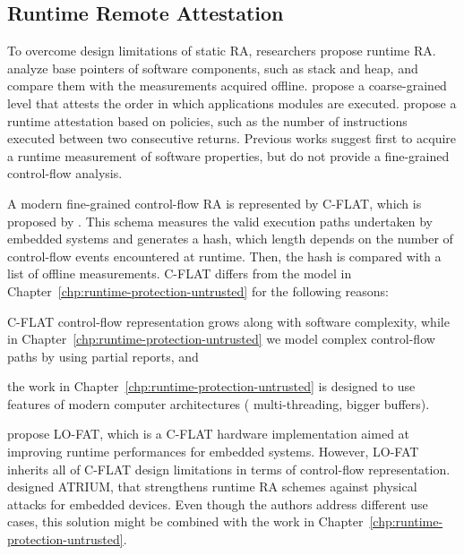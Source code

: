 \subsection{Runtime Remote Attestation}
\label{ssec:runtime-ra}

To overcome design limitations of static RA, researchers propose runtime RA. 
\cite{kil2009remote} analyze base pointers of software components, such as 
stack and heap, and compare them with the measurements acquired offline.
\cite{bailey2010trusted} propose a coarse-grained level that attests the order 
in which applications modules are executed. \cite{davi2009dynamic} propose a 
runtime attestation based on policies, such as the number of instructions 
executed between two consecutive returns. Previous works suggest first to 
acquire a runtime measurement of software properties, but do not provide a 
fine-grained control-flow analysis.

A modern fine-grained control-flow RA is represented by C-FLAT, which is 
proposed by \cite{abera2016c}. 
This schema measures the valid execution paths undertaken by embedded systems 
and generates a hash, which length depends on the number of control-flow events 
encountered at runtime. 
Then, the hash is compared with a list of offline measurements. 
C-FLAT differs from the model in Chapter~\ref{chp:runtime-protection-untrusted}
for the following reasons:
\begin{enumerate*}[label=(\roman*)]
	\item C-FLAT control-flow representation grows along with software 
	complexity, while in Chapter~\ref{chp:runtime-protection-untrusted} we 
	model complex control-flow paths by using partial reports, and
	\item the work in Chapter~\ref{chp:runtime-protection-untrusted} is 
	designed to use features of modern computer architectures (\eg 
	multi-threading, bigger buffers).
\end{enumerate*}
\cite{dessouky2017fat} propose LO-FAT, which is a C-FLAT hardware 
implementation aimed at improving runtime performances for embedded systems. 
However, LO-FAT inherits all of C-FLAT design limitations in terms of 
control-flow representation. \cite{zeitouni2017atrium} designed ATRIUM, that 
strengthens runtime RA schemes against physical attacks for embedded devices. 
Even though the authors address different use cases, this solution might be 
combined with the work in Chapter~\ref{chp:runtime-protection-untrusted}.


